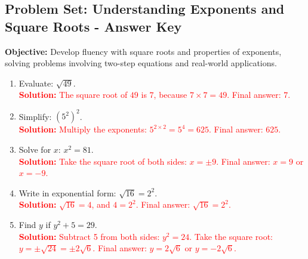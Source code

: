 \documentclass[10pt]{article}
\title{}
\date{}
\begin{document}
\subsection*{Problem Set: Understanding Exponents and Square Roots - Answer Key}
\onehalfspacing

\begin{tcolorbox}[colframe=black!40, colback=gray!5, 
coltitle=black, colbacktitle=black!20, fonttitle=\bfseries\Large, 
title=Learning Objective, halign title=center, left=5pt, right=5pt, top=5pt, bottom=15pt]
\textbf{Objective:} Develop fluency with square roots and properties of exponents, solving problems involving two-step equations and real-world applications.
\end{tcolorbox}

\begin{tcolorbox}[colframe=black!60, colback=white, 
coltitle=black, colbacktitle=black!15, fonttitle=\bfseries\Large, 
title=Exercises, halign title=center, left=10pt, right=10pt, top=10pt, bottom=60pt]
\begin{enumerate}[itemsep=3em]
    \item Evaluate: \( \sqrt{49} \).\\
    \textcolor{red}{\textbf{Solution:} The square root of \(49\) is \(7\), because \(7 \times 7 = 49\). Final answer: \(7\).}

    \item Simplify: \( (5^2)^2 \).\\
    \textcolor{red}{\textbf{Solution:} Multiply the exponents: \(5^{2 \times 2} = 5^4 = 625\). Final answer: \(625\).}

    \item Solve for \(x\): \( x^2 = 81 \).\\
    \textcolor{red}{\textbf{Solution:} Take the square root of both sides: \(x = \pm 9\). Final answer: \(x = 9\) or \(x = -9\).}

    \item Write in exponential form: \( \sqrt{16} = 2^2 \).\\
    \textcolor{red}{\textbf{Solution:} \( \sqrt{16} = 4\), and \(4 = 2^2\). Final answer: \( \sqrt{16} = 2^2\).}

    \item Find \(y\) if \(y^2 + 5 = 29\).\\
    \textcolor{red}{\textbf{Solution:} Subtract 5 from both sides: \(y^2 = 24\). Take the square root: \(y = \pm \sqrt{24} = \pm 2\sqrt{6}\). Final answer: \(y = 2\sqrt{6}\) or \(y = -2\sqrt{6}\).}


\end{enumerate}
\end{tcolorbox}
\end{document}
